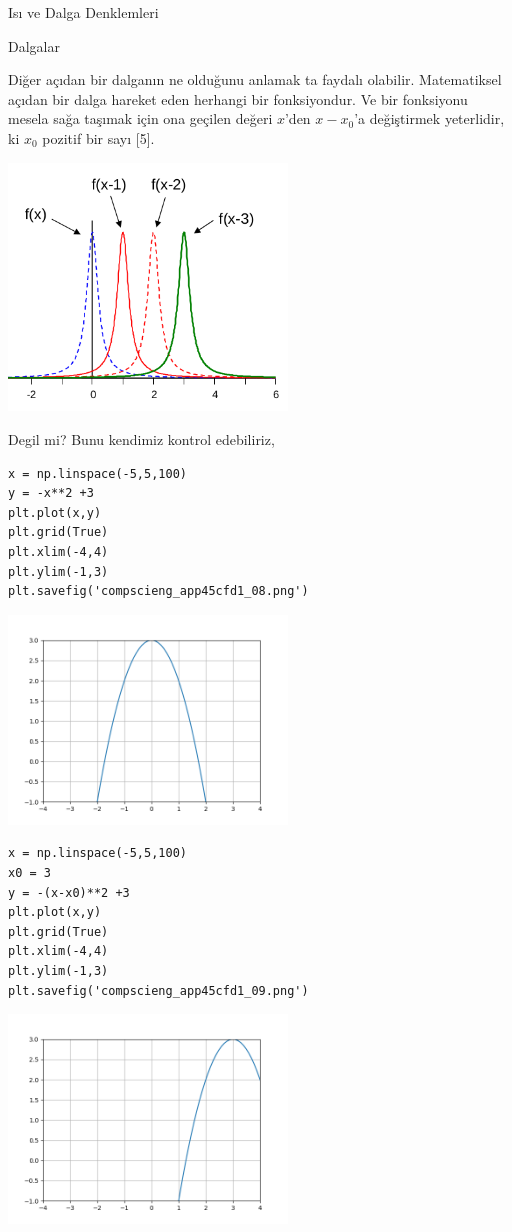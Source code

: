 \documentclass[12pt,fleqn]{article}\usepackage{../../common}
\begin{document}
Isı ve Dalga Denklemleri

Dalgalar

Diğer açıdan bir dalganın ne olduğunu anlamak ta faydalı olabilir. Matematiksel
açıdan bir dalga hareket eden herhangi bir fonksiyondur. Ve bir fonksiyonu
mesela sağa taşımak için ona geçilen değeri $x$'den $x-x_0$'a değiştirmek
yeterlidir, ki $x_0$ pozitif bir sayı [5]. 

\includegraphics[width=20em]{compscieng_app45cfd1_07.png}

Degil mi? Bunu kendimiz kontrol edebiliriz,

\begin{verbatim}
x = np.linspace(-5,5,100)
y = -x**2 +3
plt.plot(x,y)
plt.grid(True)
plt.xlim(-4,4)
plt.ylim(-1,3)
plt.savefig('compscieng_app45cfd1_08.png')
\end{verbatim}

\includegraphics[width=20em]{compscieng_app45cfd1_08.png}

\begin{verbatim}
x = np.linspace(-5,5,100)
x0 = 3
y = -(x-x0)**2 +3
plt.plot(x,y)
plt.grid(True)
plt.xlim(-4,4)
plt.ylim(-1,3)
plt.savefig('compscieng_app45cfd1_09.png')
\end{verbatim}

\includegraphics[width=20em]{compscieng_app45cfd1_09.png}
\end{document}
